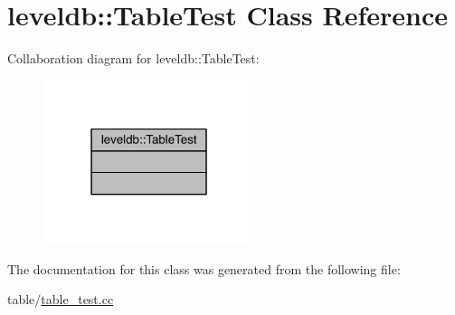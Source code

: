 \hypertarget{classleveldb_1_1_table_test}{}\section{leveldb\+:\+:Table\+Test Class Reference}
\label{classleveldb_1_1_table_test}


Collaboration diagram for leveldb\+:\+:Table\+Test\+:\nopagebreak
\begin{figure}[H]
\begin{center}
\leavevmode
\includegraphics[width=175pt]{classleveldb_1_1_table_test__coll__graph}
\end{center}
\end{figure}


The documentation for this class was generated from the following file\+:\begin{DoxyCompactItemize}
\item 
table/\hyperlink{table__test_8cc}{table\+\_\+test.\+cc}\end{DoxyCompactItemize}
